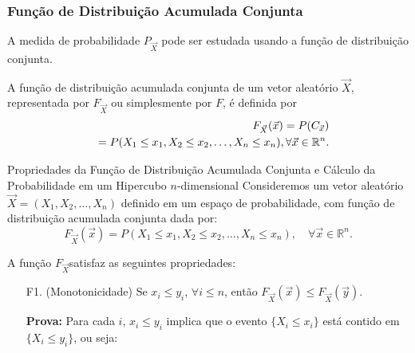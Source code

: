 \begin{frame}
\frametitle{{Função de Distribuição Acumulada Conjunta}}
 A medida de probabilidade $P_{\Vec{X}}$ pode ser estudada usando a função de distribuição conjunta.
\begin{defi}
A função de distribuição acumulada conjunta de um vetor aleatório
$\vec{X}$, representada por $F_{\vec{X}}$ ou simplesmente por $F$, é
definida por
%
\begin{eqnarray}
& & F_{\vec{X}}(\vec{x})=P(C_{\vec{x}})\nonumber \\
& & =P(X_1\leq x_1, X_2\leq x_2,\ldots,X_n\leq x_n), \forall \vec{x}\in \mathbb{R}^n.\nonumber
\end{eqnarray}
\end{defi}
%
%

\begin{block}{ Propriedades da Função de Distribuição Acumulada Conjunta e Cálculo da Probabilidade em um Hipercubo $n$-dimensional}
Consideremos um vetor aleatório \( \vec{X} = (X_1, X_2, \dots, X_n) \) definido em um espaço de probabilidade, com função de distribuição acumulada conjunta dada por:
\[
F_{\vec{X}}(\vec{x}) = P(X_1 \leq x_1, X_2 \leq x_2, \dots, X_n \leq x_n), \quad \forall \vec{x} \in \mathbb{R}^n.
\]

A função \( F_{\vec{X}} \)satisfaz as seguintes
propriedades:
\begin{enumerate}
\item[F1.](Monotonicidade) Se $x_i\leq y_i$, $\forall i\leq n$, então $F_{\vec{X}}(\vec{x})\leq F_{\vec{X}}(\vec{y})$.

\medskip
{\bf Prova:} Para cada \( i \), \( x_i \leq y_i \) implica que o evento \( \{ X_i \leq x_i \} \) está contido em \( \{ X_i \leq y_i \} \), ou seja:


\end{enumerate}
\end{block}
\end{frame}
